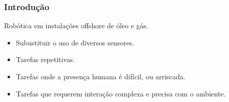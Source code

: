 \documentclass{beamer}
\begin{document}
\begin{frame}
\frametitle{Introdução}
Robótica em instalações offshore de óleo e gás.
\begin{itemize}
\item Subustituir o uso de diversos sensores.
\item Tarefas repetitivas.
\item Tarefas onde a presença humana é difícil, ou arriscada.
\item Tarefas que requerem interação complexa e precisa com o ambiente.
\end{itemize}

\newlength{\twosubht}
\newsavebox{\twosubbox}

\begin{figure}[htp]
\sbox{}
\setlength{\twosubht}{\ht\twosubbox}
\centering
{}\quad
{}
\end{figure}
\end{frame}
\end{document}
